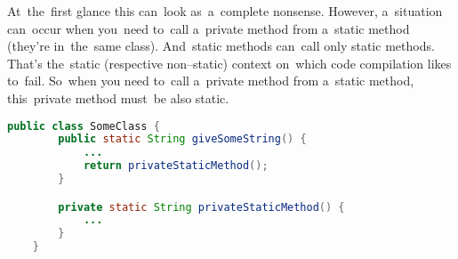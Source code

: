 \label{javaprivatestaticmethods}
At~the~first glance this can~look as~a~complete nonsense.
However, a~situation can~occur when you~need to~call a~private method from a~static method (they're in~the~same class).
And~static methods can~call only static methods.
That's the~static (respective non--static) context on~which code compilation likes to~fail.
So~when you need to~call a~private method from a~static method, this~private method must~be also static.

\begin{lstlisting}[language=Java]
    public class SomeClass {
        public static String giveSomeString() {
            ...
            return privateStaticMethod();
        }

        private static String privateStaticMethod() {
            ...
        }
    }
\end{lstlisting}

